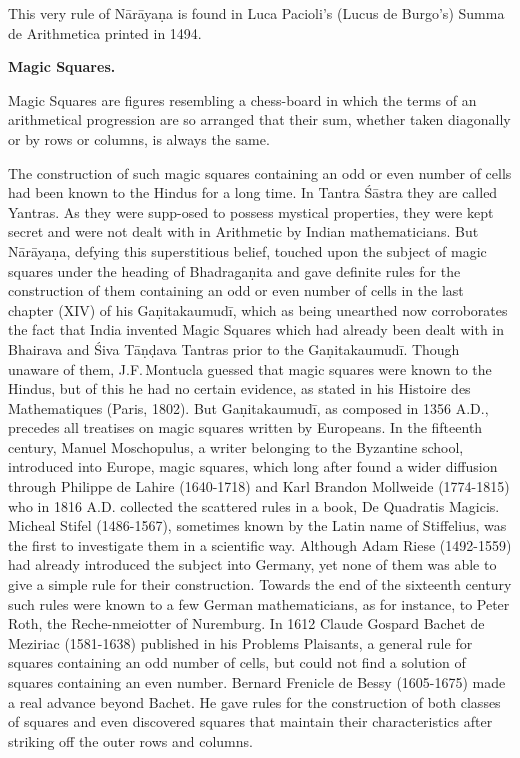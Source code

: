 \documentclass[11pt, openany]{book}
\begin{document}
This very rule of Nārāyaṇa is found in Luca Pacioli's 
(Lucus de Burgo's) Summa de Arithmetica printed in 1494.
\vspace{-2mm}

\begin{center}
    \textbf{Magic Squares.}
\end{center}
\vspace{-2mm}

 Magic Squares are figures resembling a chess-board in 
which the terms of an arithmetical progression are so arranged 
that their sum, whether taken diagonally or by rows or 
columns, is always the same.

The construction of such magic squares containing an 
odd or even number of cells had been known to the Hindus for 
\newpage
\noindent a long time. In Tantra Śāstra they are called Yantras. As 
they were supp-osed to possess mystical properties, they were 
kept secret and were not dealt with in Arithmetic by Indian 
mathematicians. But Nārāyaṇa, defying this superstitious 
belief, touched upon the subject of magic squares under the 
heading of Bhadragaṇita and gave definite rules for the construction of them containing an odd or even number of cells in the 
last chapter (XIV) of his Gaṇitakaumudī, which as being 
unearthed now corroborates the fact that India invented Magic 
Squares which had already been dealt with in Bhairava and 
Śiva Tāṇḍava Tantras prior to the Gaṇitakaumudī. Though 
unaware of them, J.F.\,Montucla guessed that magic squares 
were known to the Hindus, but of this he had no certain 
evidence, as stated in his Histoire des Mathematiques (Paris, 
1802). But Gaṇitakaumudī, as composed in 1356 A.D., 
precedes all treatises on magic squares written by Europeans. 
In the fifteenth century, Manuel Moschopulus, a writer belonging to the Byzantine school, introduced into Europe, magic 
squares, which long after found a wider diffusion through 
Philippe de Lahire (1640-1718) and Karl Brandon Mollweide 
(1774-1815) who in 1816 A.D. collected the scattered rules in 
a book, De Quadratis Magicis.\\

\vspace{-4mm}
 Micheal Stifel (1486-1567), sometimes known by the 
Latin name of Stiffelius, was the first to investigate them 
in a scientific way. Although Adam Riese (1492-1559) had 
already introduced the subject into Germany, yet none of 
them was able to give a simple rule for their construction. 
Towards the end of the sixteenth century such rules were 
known to a few German mathematicians, as for instance, 
to Peter Roth, the Reche-nmeiotter of Nuremburg. In 1612 
Claude Gospard Bachet de Meziriac (1581-1638) published 
in his Problems Plaisants, a general rule for squares containing 
an odd number of cells, but could not find a solution of squares 
containing an even number. Bernard Frenicle de Bessy 
(1605-1675) made a real advance beyond Bachet. He gave 
rules for the construction of both classes of squares and even 
discovered squares that maintain their characteristics after 
striking off the outer rows and columns. \\
\end{document}
